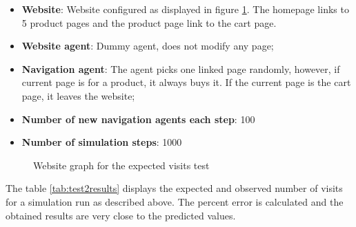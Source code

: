 \begin{itemize}
    \item \textbf{Website}: Website configured as displayed in figure 
    \ref{fig:test2website}. The homepage links to 5 product pages and the 
    product page link to the cart page.
    \item \textbf{Website agent}: Dummy agent, does not modify any page;
    \item \textbf{Navigation agent}: The agent picks one linked page randomly, 
    however, if current page is for a product, it always buys it. If the 
    current page is the cart page, it leaves the website;
    \item \textbf{Number of new navigation agents each step}: 100
    \item \textbf{Number of simulation steps}: 1000
\end{itemize}

\begin{figure}
\centering
{}
\caption{Website graph for the expected visits test} \label{fig:test2website}
\end{figure}

The table \ref{tab:test2results} displays the expected and observed number of 
visits for a simulation run as described above. The percent error is calculated 
and the obtained results are very close to the predicted values.

